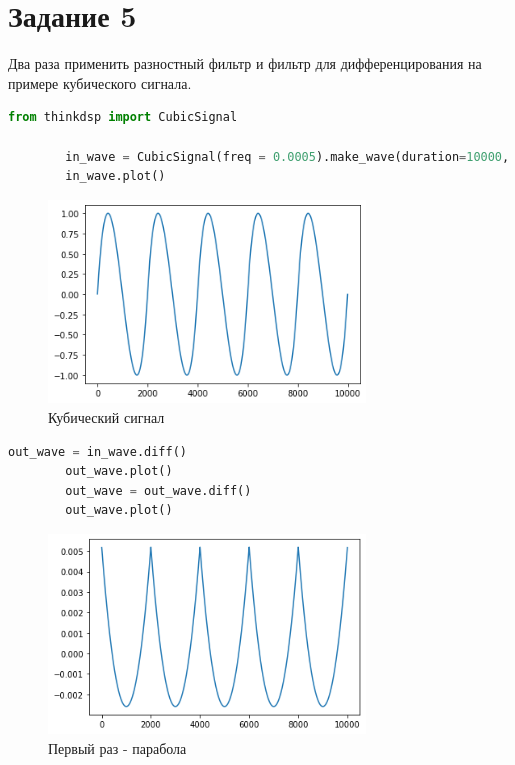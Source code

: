 \documentclass[a4paper, 12pt]{report}
\begin{document}
	\section{Задание 5}
	Два раза применить разностный фильтр и фильтр для дифференцирования на примере кубического сигнала.
	\begin{lstlisting}[language=Python,caption=Кубический сигнал]
		from thinkdsp import CubicSignal

		in_wave = CubicSignal(freq = 0.0005).make_wave(duration=10000, framerate=1)
		in_wave.plot()
	\end{lstlisting}
	\begin{figure}[H]
		\centering
		\includegraphics[width=0.75\textwidth]{task12.png}
		\caption{Кубический сигнал}
		\label{fig:task12}
	\end{figure}
	\begin{lstlisting}[language=Python,caption=Применение разностного фильтра]
		out_wave = in_wave.diff()
		out_wave.plot()
		out_wave = out_wave.diff()
		out_wave.plot()
	\end{lstlisting}
	\begin{figure}[H]
		\centering
		\includegraphics[width=0.75\textwidth]{task13.png}
		\caption{Первый раз - парабола}
		\label{fig:task13}
	\end{figure}
\end{document}
